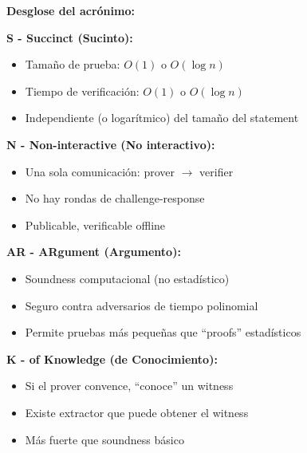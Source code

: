 \documentclass[11pt,a4paper,twoside,openright]{book}
\theoremstyle{definition}
\theoremstyle{plain}
\theoremstyle{remark}
\begin{document}
\begin{mathnote}
\textbf{Desglose del acrónimo:}

\textbf{S - Succinct (Sucinto):}
\begin{itemize}
    \item Tamaño de prueba: $O(1)$ o $O(\log n)$
    \item Tiempo de verificación: $O(1)$ o $O(\log n)$
    \item Independiente (o logarítmico) del tamaño del statement
\end{itemize}

\textbf{N - Non-interactive (No interactivo):}
\begin{itemize}
    \item Una sola comunicación: prover $\to$ verifier
    \item No hay rondas de challenge-response
    \item Publicable, verificable offline
\end{itemize}

\textbf{AR - ARgument (Argumento):}
\begin{itemize}
    \item Soundness computacional (no estadístico)
    \item Seguro contra adversarios de tiempo polinomial
    \item Permite pruebas más pequeñas que ``proofs'' estadísticos
\end{itemize}

\textbf{K - of Knowledge (de Conocimiento):}
\begin{itemize}
    \item Si el prover convence, ``conoce'' un witness
    \item Existe extractor que puede obtener el witness
    \item Más fuerte que soundness básico
\end{itemize}
\end{mathnote}
\end{document}
